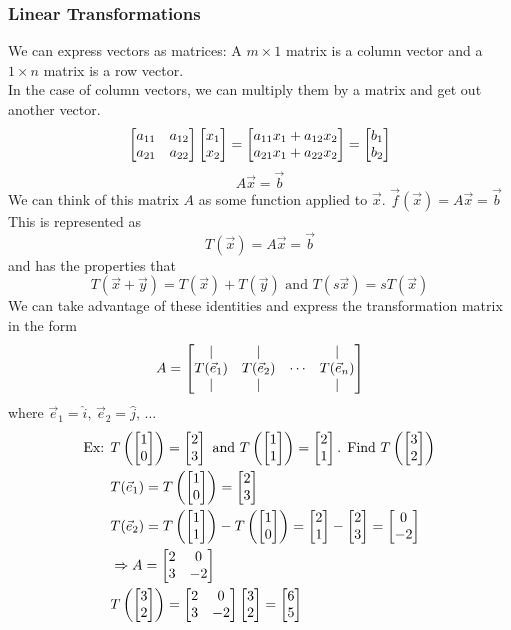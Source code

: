 \documentclass[11pt, fleqn]{article}
\begin{document}
\subsubsection{Linear Transformations}
We can express vectors as matrices: A $m\times 1$ matrix is a column vector and a $1\times n$ matrix is a row vector.\\
In the case of column vectors, we can multiply them by a matrix and get out another vector.
$$\matrixx{a_{11}&a_{12}\\a_{21}&a_{22}}\matrixx{x_1\\x_2}=\matrixx{a_{11}x_1+a_{12}x_2\\a_{21}x_1+a_{22}x_2}=\matrixx{b_1\\b_2}$$
$$A\vec{x}=\vec{b}$$
We can think of this matrix $A$ as some function applied to $\vec{x}$. $\vec{f}(\vec{x})=A\vec{x}=\vec{b}$\\
This is represented as
$$T(\vec{x})=A\vec{x}=\vec{b}$$
and has the properties that
$$T(\vec{x}+\vec{y})=T(\vec{x})+T(\vec{y})\text{ and }T(s\vec{x})=sT(\vec{x})$$
We can take advantage of these identities and express the transformation matrix in the form
$$A=\matrixx{|&|& &|\\T(\vec{e}_1)&T(\vec{e}_2)&\cdots&T(\vec{e}_n)\\|&|& &|}$$
where $\vec{e}_1=\hat{i},\,\vec{e}_2=\hat{j},\,\ldots$
\begin{align*}
    \text{Ex: }&T\brround{\matrixx{1\\0}}=\matrixx{2\\3}\text{ and }T\brround{\matrixx{1\\1}}=\matrixx{2\\1}\text{. Find }T\brround{\matrixx{3\\2}}\\
    &T(\vec{e}_1)=T\brround{\matrixx{1\\0}}=\matrixx{2\\3}\\
    &T(\vec{e}_2)=T\brround{\matrixx{1\\1}}-T\brround{\matrixx{1\\0}}=\matrixx{2\\1}-\matrixx{2\\3}=\matrixx{0\\-2}\\
    &\Ra A=\matrixx{2&0\\3&-2}\\
    &T\brround{\matrixx{3\\2}}=\matrixx{2&0\\3&-2}\matrixx{3\\2}=\matrixx{6\\5}
\end{align*}
\end{document}
